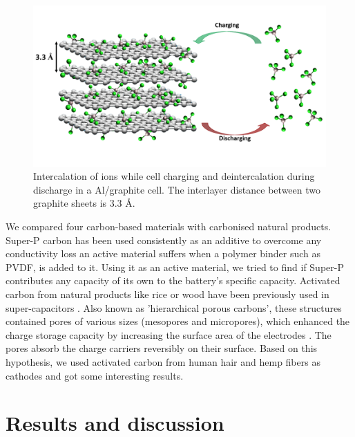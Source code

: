  \begin{figure}[tbh!]
  \centering
  \includegraphics[width=\textwidth]{Figures/chap5fig/graphmech}
    \caption{Intercalation of  ions while cell charging and deintercalation during discharge in a Al/graphite cell. The interlayer distance between two graphite sheets is 3.3 \AA.}
  \label{Figures/chap5fig:graphmech}
\end{figure}

We compared four carbon-based materials with carbonised natural products. Super-P carbon has been used consistently as an additive to overcome any conductivity loss an active material suffers when a polymer binder such as PVDF, is added to it. Using it as an active material, we tried to find if Super-P contributes any capacity of its own to the battery's specific capacity. Activated carbon from natural products like rice or wood have been previously used in super-capacitors \cite{hussain_development_2019, frackowiak_carbon_2001}. Also known as 'hierarchical porous carbons', these structures contained pores of various sizes (mesopores and micropores), which enhanced the charge storage capacity by increasing the surface area of the electrodes . The pores absorb the charge carriers reversibly on their surface. Based on this hypothesis, we used activated carbon from human hair and hemp fibers as cathodes and got some interesting results. 

\section{Results and discussion}


